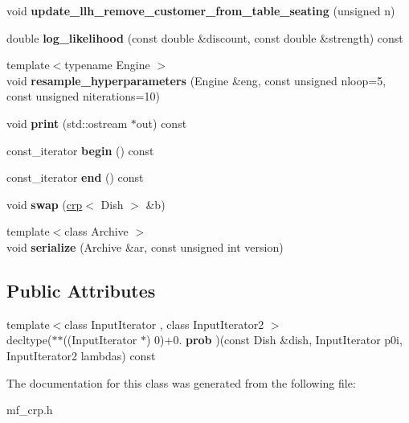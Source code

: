 \begin{DoxyCompactItemize}
\item 
\mbox{\label{classcpyp_1_1mf__crp_a74ceb4b22a6983747cb34f5626dab66b}} 
void {\bfseries update\+\_\+llh\+\_\+remove\+\_\+customer\+\_\+from\+\_\+table\+\_\+seating} (unsigned n)
\item 
\mbox{\label{classcpyp_1_1mf__crp_a2d1980ec257dd9c1c58eaaedb9c5f162}} 
double {\bfseries log\+\_\+likelihood} (const double \&discount, const double \&strength) const
\item 
\mbox{\label{classcpyp_1_1mf__crp_ac8ba4053ee8bd21ac72001a957f69e48}} 
{\footnotesize template$<$typename Engine $>$ }\\void {\bfseries resample\+\_\+hyperparameters} (Engine \&eng, const unsigned nloop=5, const unsigned niterations=10)
\item 
\mbox{\label{classcpyp_1_1mf__crp_a7a50940e237a5408d7aefe0120dc1281}} 
void {\bfseries print} (std\+::ostream $\ast$out) const
\item 
\mbox{\label{classcpyp_1_1mf__crp_a5b973d55859f6da3a50659cd6758b7ac}} 
const\+\_\+iterator {\bfseries begin} () const
\item 
\mbox{\label{classcpyp_1_1mf__crp_ad4a767b6ba8f735521fe927ee6bb2134}} 
const\+\_\+iterator {\bfseries end} () const
\item 
\mbox{\label{classcpyp_1_1mf__crp_ad0ce890e0e93f564dd0d012bf0eed873}} 
void {\bfseries swap} (\mbox{\hyperlink{classcpyp_1_1crp}{crp}}$<$ Dish $>$ \&b)
\item 
\mbox{\label{classcpyp_1_1mf__crp_a50a7055aff443be0f4d7f923eef6a541}} 
{\footnotesize template$<$class Archive $>$ }\\void {\bfseries serialize} (Archive \&ar, const unsigned int version)
\end{DoxyCompactItemize}
\subsection*{Public Attributes}
\begin{DoxyCompactItemize}
\item 
\mbox{\label{classcpyp_1_1mf__crp_ad67ffee5e2e32b852be3137fc4fa7e9d}} 
{\footnotesize template$<$class Input\+Iterator , class Input\+Iterator2 $>$ }\\decltype($\ast$$\ast$((Input\+Iterator $\ast$) 0)+0. {\bfseries prob} )(const Dish \&dish, Input\+Iterator p0i, Input\+Iterator2 lambdas) const
\end{DoxyCompactItemize}


The documentation for this class was generated from the following file\+:\begin{DoxyCompactItemize}
\item 
mf\+\_\+crp.\+h\end{DoxyCompactItemize}
